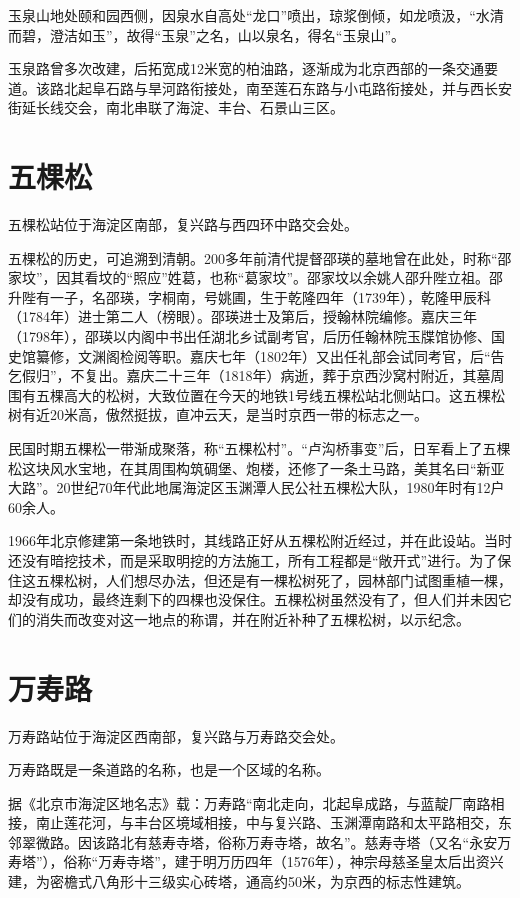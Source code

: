 玉泉山地处颐和园西侧，因泉水自高处“龙口”喷出，琼浆倒倾，如龙喷汲，“水清而碧，澄洁如玉”，故得“玉泉”之名，山以泉名，得名“玉泉山”。

玉泉路曾多次改建，后拓宽成12米宽的柏油路，逐渐成为北京西部的一条交通要道。该路北起阜石路与旱河路衔接处，南至莲石东路与小屯路衔接处，并与西长安街延长线交会，南北串联了海淀、丰台、石景山三区。

\section{五棵松}
五棵松站位于海淀区南部，复兴路与西四环中路交会处。

五棵松的历史，可追溯到清朝。200多年前清代提督邵瑛的墓地曾在此处，时称“邵家坟”，因其看坟的“照应”姓葛，也称“葛家坟”。邵家坟以余姚人邵升陛立祖。邵升陛有一子，名邵瑛，字桐南，号姚圃，生于乾隆四年（1739年），乾隆甲辰科（1784年）进士第二人（榜眼）。邵瑛进士及第后，授翰林院编修。嘉庆三年（1798年），邵瑛以内阁中书出任湖北乡试副考官，后历任翰林院玉牒馆协修、国史馆纂修，文渊阁检阅等职。嘉庆七年（1802年）又出任礼部会试同考官，后“告乞假归”，不复出。嘉庆二十三年（1818年）病逝，葬于京西沙窝村附近，其墓周围有五棵高大的松树，大致位置在今天的地铁1号线五棵松站北侧站口。这五棵松树有近20米高，傲然挺拔，直冲云天，是当时京西一带的标志之一。

民国时期五棵松一带渐成聚落，称“五棵松村”。“卢沟桥事变”后，日军看上了五棵松这块风水宝地，在其周围构筑碉堡、炮楼，还修了一条土马路，美其名曰“新亚大路”。20世纪70年代此地属海淀区玉渊潭人民公社五棵松大队，1980年时有12户60余人。

1966年北京修建第一条地铁时，其线路正好从五棵松附近经过，并在此设站。当时还没有暗挖技术，而是采取明挖的方法施工，所有工程都是“敞开式”进行。为了保住这五棵松树，人们想尽办法，但还是有一棵松树死了，园林部门试图重植一棵，却没有成功，最终连剩下的四棵也没保住。五棵松树虽然没有了，但人们并未因它们的消失而改变对这一地点的称谓，并在附近补种了五棵松树，以示纪念。

\section{万寿路}
万寿路站位于海淀区西南部，复兴路与万寿路交会处。

万寿路既是一条道路的名称，也是一个区域的名称。

据《北京市海淀区地名志》载：万寿路“南北走向，北起阜成路，与蓝靛厂南路相接，南止莲花河，与丰台区境域相接，中与复兴路、玉渊潭南路和太平路相交，东邻翠微路。因该路北有慈寿寺塔，俗称万寿寺塔，故名”。慈寿寺塔（又名“永安万寿塔”），俗称“万寿寺塔”，建于明万历四年（1576年），神宗母慈圣皇太后出资兴建，为密檐式八角形十三级实心砖塔，通高约50米，为京西的标志性建筑。

